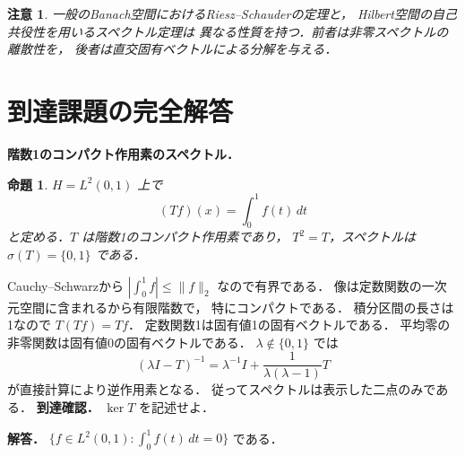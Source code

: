 \documentclass[a5paper,10pt,onecolumn]{jsarticle}
\makeatletter
\theoremstyle{mathnotetheorem}
\newtheorem{proposition}[theorem]{命題}
\newtheorem{remark}[theorem]{注意}
\renewcommand{\proofname}{証明}
\renewenvironment{proof}[1][\proofname]{%
  \par\pushQED{\qed}\normalfont\topsep4\p@\@plus2\p@\relax
  \trivlist\item[\hskip\labelsep\bfseries #1]\ignorespaces
}{\popQED\endtrivlist\@endpefalse}
\makeatother
\begin{document}
\begin{remark}
一般のBanach空間におけるRiesz--Schauderの定理と，
Hilbert空間の自己共役性を用いるスペクトル定理は
異なる性質を持つ．前者は非零スペクトルの離散性を，
後者は直交固有ベクトルによる分解を与える．
\end{remark}

\section{到達課題の完全解答}
\noindent\textbf{階数1のコンパクト作用素のスペクトル．}
\begin{proposition}
$H=L^2(0,1)$ 上で
\[
(Tf)(x)=\int_0^1f(t)\,dt
\]
と定める．$T$ は階数1のコンパクト作用素であり，
$T^2=T$，スペクトルは $\sigma(T)=\{0,1\}$ である．
\end{proposition}
\begin{proof}
Cauchy--Schwarzから
$|\int_0^1f|\le\|f\|_2$ なので有界である．
像は定数関数の一次元空間に含まれるから有限階数で，
特にコンパクトである．
積分区間の長さは1なので
$T(Tf)=Tf$．
定数関数1は固有値1の固有ベクトルである．
平均零の非零関数は固有値0の固有ベクトルである．
$\lambda\notin\{0,1\}$ では
\[
(\lambda I-T)^{-1}
=\lambda^{-1}I+\frac1{\lambda(\lambda-1)}T
\]
が直接計算により逆作用素となる．
従ってスペクトルは表示した二点のみである．
\end{proof}
\noindent\textbf{到達確認．}
$\ker T$ を記述せよ．
\par\noindent\textbf{解答．}
$\{f\in L^2(0,1):\int_0^1f(t)\,dt=0\}$ である．
\end{document}
